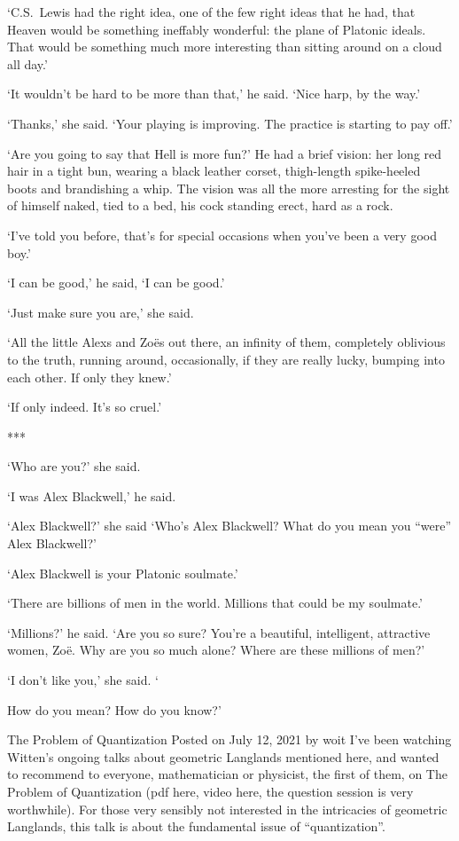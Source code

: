 `C.S.~Lewis had the right idea, one of the few right ideas that he
had, that Heaven would be something ineffably wonderful: the plane
of Platonic ideals. That would be something much more interesting than sitting around on a
cloud all day.'

`It wouldn't be hard to be more than that,' he said. `Nice harp, by the
way.'

`Thanks,' she said. `Your playing is improving. The practice is
starting to pay off.'

`Are you going to say that Hell is more fun?' He had a brief
vision: her long red hair in a tight bun, wearing a black
leather corset, thigh-length spike-heeled boots and brandishing a
whip. The vision was all the more arresting for the sight of himself
naked, tied to a bed, his cock standing erect, hard as a rock.

`I've told you before, that's for special occasions when you've been a {\twelveit very\/} good boy.'

`I can be good,' he said, `I can be good.'

`Just make sure you are,' she said.

`All the little Alexs and Zoës out there, an infinity of them,
completely oblivious to the truth, running around, occasionally, if
they are really lucky, bumping into each other. If only they knew.'

`If only indeed. It's so cruel.'

***

`Who are you?' she said.

`I was Alex Blackwell,' he said.

`Alex Blackwell?' she said `Who's Alex Blackwell? What do you mean you
``were'' Alex Blackwell?'

`Alex Blackwell is your Platonic soulmate.'

`There are billions of men in the world. Millions that
could be my soulmate.'

`Millions?' he said. `Are you so sure? You're a beautiful, intelligent,
attractive women, Zoë. Why are you so much alone? Where are
these millions of men?'

`I don't like you,' she said. `

 How do you mean? How do you know?'


The Problem of Quantization
Posted on July 12, 2021 by woit
I’ve been watching Witten’s ongoing talks about geometric Langlands mentioned here, and wanted to recommend to everyone, mathematician or physicist, the first of them, on The Problem of Quantization (pdf here, video here, the question session is very worthwhile). For those very sensibly not interested in the intricacies of geometric Langlands, this talk is about the fundamental issue of “quantization”.

